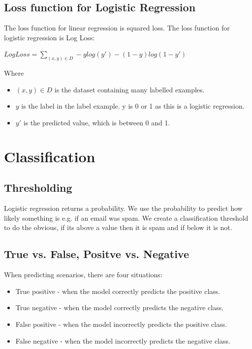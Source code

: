 \documentclass[12pt]{article}
\begin{document}
\subsection{Loss function for Logistic Regression}
The loss function for linear regression is squared loss. The loss function for logistic regression is Log Loss:
\begin{center}
\begin{LARGE}
$Log Loss = \sum_{(x, y) \in D}^{} -ylog(y') - (1 - y)log(1 - y')$
\end{LARGE}
\end{center}
Where 
\begin{itemize}
\item $(x,y) \in D$ is the dataset containing many labelled examples.
\item $y$ is the label in the label example. y is 0 or 1 as this is a logistic regression.
\item $y'$ is the predicted value, which is between 0 and 1.
\end{itemize}
\section{Classification}
\subsection{Thresholding}
Logistic regression returns a probability. We use the probability to predict how likely something is e.g. if an email was spam. We create a classification threshold to do the obvious, if its above a value then it is spam and if below it is not.
\subsection{True vs. False, Positve vs. Negative}
When predicting scenarios, there are four situations:
\begin{itemize}
\item True positive - when the model correctly predicts the positive class.
\item True negative - when the model correctly predicts the negative class.
\item False positive - when the model incorrectly predicts the positive class. 
\item False negative - when the model incorrectly predicts the negative class. 
\end{itemize}
\end{document}
